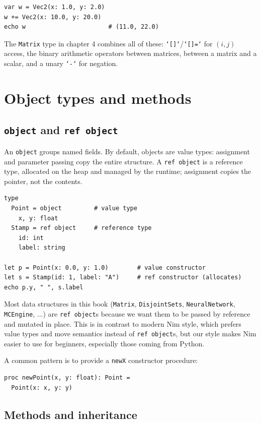 \documentclass[justified, sixbynine]{tufte-book}
\def\ft{\small\tt}
\theoremstyle{plain}%
\newtheorem * {corollary}{Corollary}
\theoremstyle{definition}
\theoremstyle{remark}
\newtheorem * {remark}{Remark}
\newtheorem * {note}{Note}
\begin{document}
\begin{fullwidth}
\begin{lstlisting}
var w = Vec2(x: 1.0, y: 2.0)
w += Vec2(x: 10.0, y: 20.0)
echo w                       # (11.0, 22.0)
\end{lstlisting}

The {\ft Matrix} type in chapter 4 combines all of these: {\ft `[]`}/{\ft `[]=`} for $(i, j)$ access, the binary arithmetic operators between matrices, between a matrix and a scalar, and a unary {\ft `-`} for negation.

\goodbreak\section{Object types and methods}

\goodbreak\subsection{{\ft object} and {\ft ref object}}


An {\ft object} groups named fields. By default, objects are value types: assignment and parameter passing copy the entire structure. A {\ft ref object} is a reference type, allocated on the heap and managed by the runtime; assignment copies the pointer, not the contents.

\begin{lstlisting}
type
  Point = object         # value type
    x, y: float
  Stamp = ref object     # reference type
    id: int
    label: string

let p = Point(x: 0.0, y: 1.0)        # value constructor
let s = Stamp(id: 1, label: "A")     # ref constructor (allocates)
echo p.y, " ", s.label
\end{lstlisting}

Most data structures in this book ({\ft Matrix}, {\ft DisjointSets}, {\ft NeuralNetwork}, {\ft MCEngine}, ...) are {\ft ref object}s because we want them to be passed by reference and mutated in place. This is in contrast to modern Nim style, which prefers value types and move semantics instead of {\ft ref object}s, but our style makes Nim easier to use for beginners, especially those coming from Python.

A common pattern is to provide a {\ft newX} constructor procedure:

\begin{lstlisting}
proc newPoint(x, y: float): Point =
  Point(x: x, y: y)
\end{lstlisting}

\goodbreak\subsection{Methods and inheritance}


\end{fullwidth}
\end{document}
